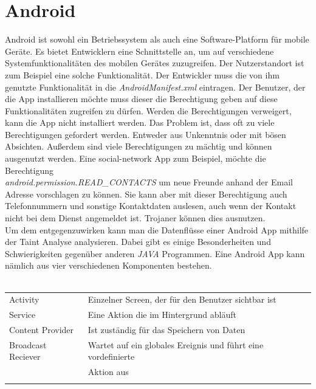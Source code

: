 \documentclass[runningheads]{llncs}
\begin{document}
\section{Android}
Android ist sowohl ein Betriebssystem als auch eine Software-Platform für mobile Geräte. Es bietet Entwicklern eine Schnittstelle an, um auf verschiedene Systemfunktionalitäten des mobilen Gerätes zuzugreifen. Der Nutzerstandort ist zum Beispiel eine solche Funktionalität. Der Entwickler muss die von ihm genutzte Funktionalität in die \emph{AndroidManifest.xml} eintragen. Der Benutzer, der die App installieren möchte muss dieser die Berechtigung geben auf diese Funktionalitäten zugreifen zu dürfen. Werden die Berechtigungen verweigert, kann die App nicht installiert werden. Das Problem ist, dass oft zu viele Berechtigungen gefordert werden. Entweder aus Unkenntnis oder mit bösen Absichten. Außerdem sind viele Berechtigungen zu mächtig und können ausgenutzt werden. Eine social-network App zum Beispiel, möchte die Berechtigung\\\emph{android.permission.READ\_CONTACTS} um neue Freunde anhand der Email Adresse vorschlagen zu können. Sie kann aber mit dieser Berechtigung auch Telefonnummern und sonstige Kontaktdaten auslesen, auch wenn der Kontakt nicht bei dem Dienst angemeldet ist. Trojaner können dies ausnutzen. 
\\Um dem entgegenzuwirken kann man die Datenflüsse einer Android App mithilfe der Taint Analyse analysieren. Dabei gibt es einige Besonderheiten und 
\\Schwierigkeiten gegenüber anderen \emph{JAVA} Programmen. Eine Android App kann nämlich aus vier verschiedenen Komponenten bestehen.\\\\
\begin{tabular}{ll}
	Activity & Einzelner Screen, der für den Benutzer sichtbar ist\\
	Service & Eine Aktion die im Hintergrund abläuft\\
	Content Provider & Ist zuständig für das Speichern von Daten\\
	Broadcast Reciever & Wartet auf ein globales Ereignis und führt eine vordefinierte \\
	& Aktion aus\\\\
\end{tabular}
\end{document}
